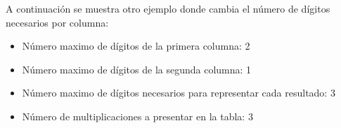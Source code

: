 \documentclass[svgnames,addpoints]{exam}
\newlength{\zerowidth}
\newlength{\zeroheight}
\begin{document}
\begin{minipage}{0.33\linewidth}
\begin{center}
  \end{center}
\end{minipage}


A continuación se muestra otro ejemplo donde cambia el número de dígitos
necesarios por columna:

\begin{itemize}

  \item Número maximo de dígitos de la primera columna: 2

  \item Número maximo de dígitos de la segunda columna: 1

  \item Número maximo de dígitos necesarios para representar cada resultado: 3

  \item Número de multiplicaciones a presentar en la tabla: 3

\end{itemize}
\end{document}
